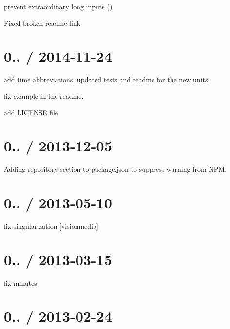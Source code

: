 
\begin{DoxyItemize}
\item prevent extraordinary long inputs ()
\item Fixed broken readme link
\end{DoxyItemize}

\section*{0.. / 2014-\/11-\/24 }


\begin{DoxyItemize}
\item add time abbreviations, updated tests and readme for the new units
\item fix example in the readme.
\item add L\+I\+C\+E\+N\+SE file
\end{DoxyItemize}

\section*{0.. / 2013-\/12-\/05 }


\begin{DoxyItemize}
\item Adding repository section to package.\+json to suppress warning from N\+PM.
\end{DoxyItemize}

\section*{0.. / 2013-\/05-\/10 }


\begin{DoxyItemize}
\item fix singularization \mbox{[}visionmedia\mbox{]}
\end{DoxyItemize}

\section*{0.. / 2013-\/03-\/15 }


\begin{DoxyItemize}
\item fix minutes
\end{DoxyItemize}

\section*{0.. / 2013-\/02-\/24 }


